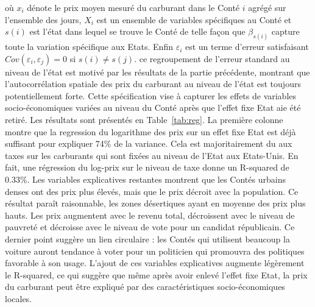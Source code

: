{où $x_{i}$ dénote le prix moyen mesuré du carburant dans le Conté $i$ agrégé sur l'ensemble des jours, $X_{i}$ est un ensemble de variables spécifiques au Conté et $s(i)$ est l'état dans lequel se trouve le Conté de telle façon que $\beta_{s(i)}$ capture toute la variation spécifique aux Etats. Enfin $\varepsilon_{i}$ est un terme d'erreur satisfaisant $Cov(\varepsilon_{i}, \varepsilon_{j}) = 0$ si $s(i) \neq s(j)$. ce regroupement de l'erreur standard au niveau de l'état est motivé par les résultats de la partie précédente, montrant que l'autocorrélation spatiale des prix du carburant au niveau de l'état est toujours potentiellement forte. Cette spécification vise à capturer les effets de variables socio-économiques variées au niveau du Conté après que l'effet fixe Etat aie été retiré. Les résultats sont présentés en Table~\ref{tab:reg}. La première colonne montre que la regression du logarithme des prix sur un effet fixe Etat est déjà suffisant pour expliquer 74\% de la variance. Cela est majoritairement du aux taxes sur les carburants qui sont fixées au niveau de l'Etat aux Etats-Unis. En fait, une régression du log-prix sur le niveau de taxe donne un R-squared de 0.33\%. Les variables explicatives restantes montrent que les Contés urbains denses ont des prix plus élevés, mais que le prix décroit avec la population. Ce résultat paraît raisonnable, les zones désertiques ayant en moyenne des prix plus hauts. Les prix augmentent avec le revenu total, décroissent avec le niveau de pauvreté et décroisse avec le niveau de vote pour un candidat républicain. Ce dernier point suggère un lien circulaire : les Contés qui utilisent beaucoup la voiture auront tendance à voter pour un politicien qui promouvra des politiques favorable à son usage. L'ajout de ces variables explicatives augmente légèrement le R-squared, ce qui suggère que même après avoir enlevé l'effet fixe Etat, la prix du carburant peut être expliqué par des caractéristiques socio-économiques locales.
}



